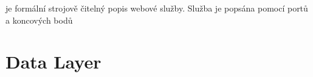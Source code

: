  je formální strojově čitelný popis webové služby. Služba je popsána pomocí portů a koncových bodů






\section{Data Layer}

